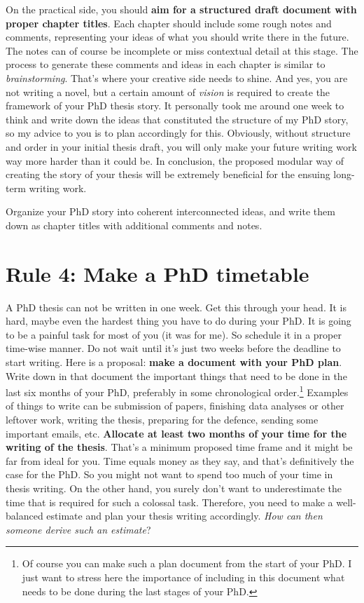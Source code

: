 \documentclass[
  12pt,
]{book}
\begin{document}
On the practical side, you should \textbf{aim for a structured draft document with proper chapter titles}.
Each chapter should include some rough notes and comments, representing your ideas of what you should write there in the future.
The notes can of course be incomplete or miss contextual detail at this stage.
The process to generate these comments and ideas in each chapter is similar to \emph{brainstorming}.
That's where your creative side needs to shine.
And yes, you are not writing a novel, but a certain amount of \emph{vision} is required to create the framework of your PhD thesis story.
It personally took me around one week to think and write down the ideas that constituted the structure of my PhD story, so my advice to you is to plan accordingly for this.
Obviously, without structure and order in your initial thesis draft, you will only make your future writing work way more harder than it could be.
In conclusion, the proposed modular way of creating the story of your thesis will be extremely beneficial for the ensuing long-term writing work.

Organize your PhD story into coherent interconnected ideas, and write them down as chapter titles with additional comments and notes.

\hypertarget{rule4}{%
\section*{\texorpdfstring{\textbf{Rule 4:} Make a PhD timetable}{Rule 4: Make a PhD timetable}}\label{rule4}}

A PhD thesis can not be written in one week.
Get this through your head.
It is hard, maybe even the hardest thing you have to do during your PhD.
It is going to be a painful task for most of you (it was for me).
So schedule it in a proper time-wise manner.
Do not wait until it's just two weeks before the deadline to start writing.
Here is a proposal: \textbf{make a document with your PhD plan}.
Write down in that document the important things that need to be done in the last six months of your PhD, preferably in some chronological order.\footnote{Of course you can make such a plan document from the start of your PhD. I just want to stress here the importance of including in this document what needs to be done during the last stages of your PhD.}
Examples of things to write can be submission of papers, finishing data analyses or other leftover work, writing the thesis, preparing for the defence, sending some important emails, etc.
\textbf{Allocate at least two months of your time for the writing of the thesis}.
That's a minimum proposed time frame and it might be far from ideal for you.
Time equals money as they say, and that's definitively the case for the PhD.
So you might not want to spend too much of your time in thesis writing.
On the other hand, you surely don't want to underestimate the time that is required for such a colossal task.
Therefore, you need to make a well-balanced estimate and plan your thesis writing accordingly.
\emph{How can then someone derive such an estimate}?
\end{document}
